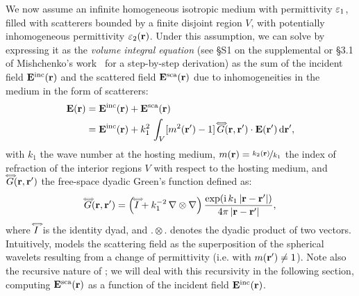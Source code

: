 We now assume an infinite homogeneous isotropic medium with permittivity $\varepsilon_1$, filled with scatterers bounded by a finite disjoint region $V$, with potentially inhomogeneous permittivity $\varepsilon_2(\mathbf{r})$. Under this assumption, we can solve  by expressing it as the \emph{volume integral equation} (see \S S1 on the supplemental or \S 3.1 of Mishchenko's work~ for a step-by-step derivation) as the sum of the incident field $\mathbf{E}^\text{inc}(\mathbf{r})$ and the scattered field $\mathbf{E}^\text{sca}(\mathbf{r})$ due to inhomogeneities in the medium in the form of scatterers:
%
\begin{align}
    \mathbf{E}(\mathbf{r}) & = \mathbf{E}^\text{inc}(\mathbf{r}) + \mathbf{E}^\text{sca}(\mathbf{r}) \\
    & =\mathbf{E}^\text{inc}(\mathbf{r}) + k_1^2\,\int_V [m^2(\mathbf{r}')-1] \,\accentset{\Longleftrightarrow}{G}(\mathbf{r},\mathbf{r}') \cdot \mathbf{E}(\mathbf{r}') \,\text{d}\mathbf{r}',
    \label{eq:vri}
\end{align}
%
with $k_1$ the wave number at the hosting medium, $m(\mathbf{r}) = \nicefrac{k_2(\mathbf{r})}{k_1}$ the index of refraction of the interior regions $V$ with respect to the hosting medium,  and $\accentset{\Longleftrightarrow}{G}(\mathbf{r},\mathbf{r}')$ the free-space dyadic Green's function defined as:
%
\begin{equation}
    \accentset{\Longleftrightarrow}{G}(\mathbf{r},\mathbf{r}') = \left(\accentset{\Longleftrightarrow}{I} + k_1^{-2}\,\nabla\otimes\nabla\right) \frac{\exp(\text{i}\,k_1 \,|\mathbf{r}-\mathbf{r}'|)}{4\pi\,|\mathbf{r}-\mathbf{r}'|},
    \label{eq:greenfunc}
\end{equation}
%
where $\accentset{\Longleftrightarrow}{I}$ is the identity dyad, and $. \otimes .$ denotes the dyadic product of two vectors.  Intuitively,  models the scattering field as the superposition of the spherical wavelets resulting from a change of permittivity (i.e. with $m(\mathbf{r}')\neq1$). Note also the recursive nature of ; we will deal with this recursivity in the following section, computing $\mathbf{E}^\text{sca}(\mathbf{r})$ as a function of the incident field $\mathbf{E}^\text{inc}(\mathbf{r})$. 



